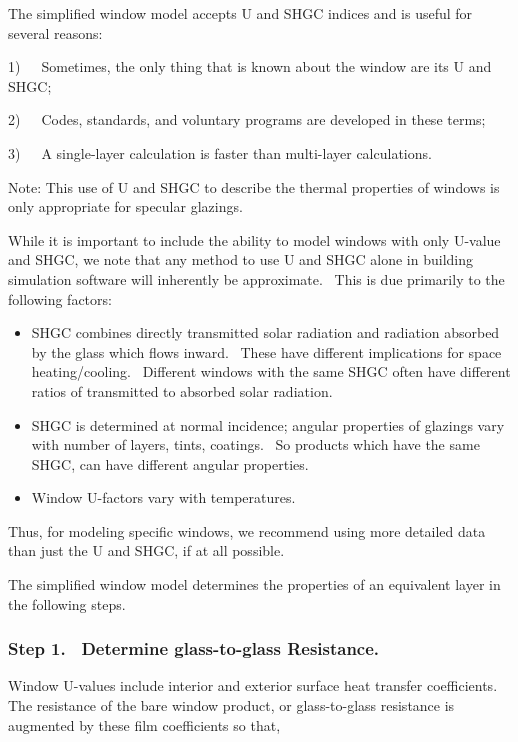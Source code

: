 The simplified window model accepts U and SHGC indices and is useful for several reasons:

1)~~~Sometimes, the only thing that is known about the window are its U and SHGC;

2)~~~Codes, standards, and voluntary programs are developed in these terms;

3)~~~A single-layer calculation is faster than multi-layer calculations.

Note: This use of U and SHGC to describe the thermal properties of windows is only appropriate for specular glazings.

While it is important to include the ability to model windows with only U-value and SHGC, we note that any method to use U and SHGC alone in building simulation software will inherently be approximate.~ This is due primarily to the following factors:

\begin{itemize}
\item
  SHGC combines directly transmitted solar radiation and radiation absorbed by the glass which flows inward.~ These have different implications for space heating/cooling.~ Different windows with the same SHGC often have different ratios of transmitted to absorbed solar radiation.
\item
  SHGC is determined at normal incidence; angular properties of glazings vary with number of layers, tints, coatings.~ So products which have the same SHGC, can have different angular properties.
\item
  Window U-factors vary with temperatures.
\end{itemize}

Thus, for modeling specific windows, we recommend using more detailed data than just the U and SHGC, if at all possible.

The simplified window model determines the properties of an equivalent layer in the following steps.

\subsubsection{Step 1.~ Determine glass-to-glass Resistance.}\label{step-1.-determine-glass-to-glass-resistance.}

Window U-values include interior and exterior surface heat transfer coefficients.~ The resistance of the bare window product, or glass-to-glass resistance is augmented by these film coefficients so that,

